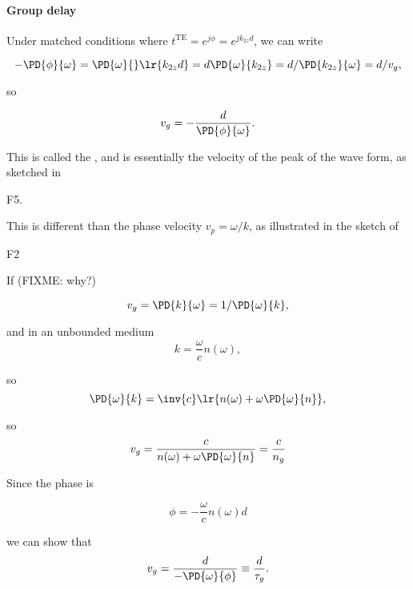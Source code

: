 \paragraph{Group delay}

Under matched conditions where \( t^{\textrm{TE}} = e^{j \phi} = e^{j k_{2z} d} \), we can write

\begin{dmath}\label{eqn:emtLecture10:520}
- \PD{\phi}{\omega}
= \PD{\omega}{} \lr{ k_{2z} d }
= d \PD{\omega}{k_{2z}}
= d /\PD{k_{2z}}{\omega}
= d / v_g,
\end{dmath}

so

\begin{dmath}\label{eqn:emtLecture10:540}
v_g = -\frac{d}{\PD{\phi}{\omega}}.
\end{dmath}

This is called the , and is essentially the velocity of the peak of the wave form, as sketched in

F5.

This is different than the phase velocity \( v_p = \omega/k \), as illustrated in the sketch of

F2

If (FIXME: why?)

\begin{dmath}\label{eqn:emtLecture10:660}
v_g
= \PD{k}{\omega}
= 1/\PD{\omega}{k},
\end{dmath}

and in an unbounded medium
\begin{dmath}\label{eqn:emtLecture10:560}
   k = \frac{\omega}{c} n(\omega),
\end{dmath}

so
\begin{dmath}\label{eqn:emtLecture10:580}
\PD{\omega}{k}
=
\inv{c} \lr{ n(\omega) + \omega \PD{\omega}{n} },
\end{dmath}

so
\begin{equation}\label{eqn:emtLecture10:600}
v_g
= \frac{c}{n(\omega) + \omega \PD{\omega}{n} }
= \frac{c}{n_g}
\end{equation}

Since the phase is

\begin{dmath}\label{eqn:emtLecture10:680}
\phi = -\frac{\omega}{c} n(\omega) d
\end{dmath}

we can show that
\begin{dmath}\label{eqn:emtLecture10:700}
v_g
= \frac{d}{-\PD{\omega}{\phi}}
\equiv
\frac{d}{\tau_g}.
\end{dmath}

